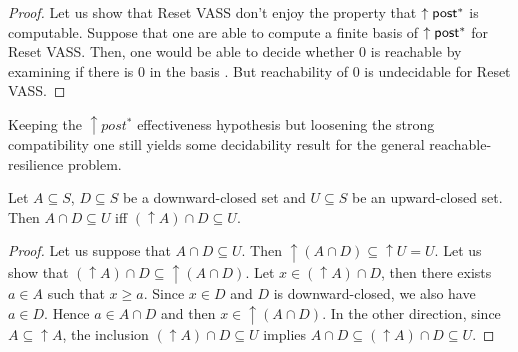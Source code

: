 \begin{proof}
Let us show that Reset VASS don't enjoy the property that $\uparrow \textsf{post}^*$ is computable.
Suppose that one are able to compute a finite basis of $\uparrow \textsf{post}^*$ for Reset VASS. Then, one would be able to decide whether $0$ is reachable 
by examining if there is %
$0$ in the basis%
. But reachability of $0$  %
is undecidable for Reset VASS. 
\end{proof}



%
%
%



Keeping the $\uparrow post^*$ effectiveness hypothesis but loosening the strong compatibility one still yields some decidability result for the general reachable-resilience problem.


\begin{lemma}\label{Lemma intersection}
Let $A \subseteq S$, $D \subseteq S$ be a downward-closed set and $U \subseteq S$ be an upward-closed set. 
Then $A \cap D \subseteq U$  iff $ (\uparrow  A) \cap D \subseteq U$.
\end{lemma}


\begin{proof}
Let us suppose that $A \cap D \subseteq U$. Then ${\uparrow (A \cap D)} \subseteq {\uparrow U} = U$.
Let us show that $({\uparrow A}) \cap D \subseteq {\uparrow (A \cap D)}$.
Let $x \in ({\uparrow A}) \cap D$, then there exists $a \in A$ such that $x \geq a$.
Since $x \in D$ and $D$ is downward-closed, we also have $a \in D$.
Hence $a \in A \cap D$ and then $x \in { \uparrow (A \cap D)}$.
In the other direction,
since $A \subseteq {\uparrow A}$, the inclusion
$({\uparrow  A}) \cap D \subseteq U$ implies
$A \cap D \subseteq ({\uparrow  A}) \cap D \subseteq U$.
\end{proof}




